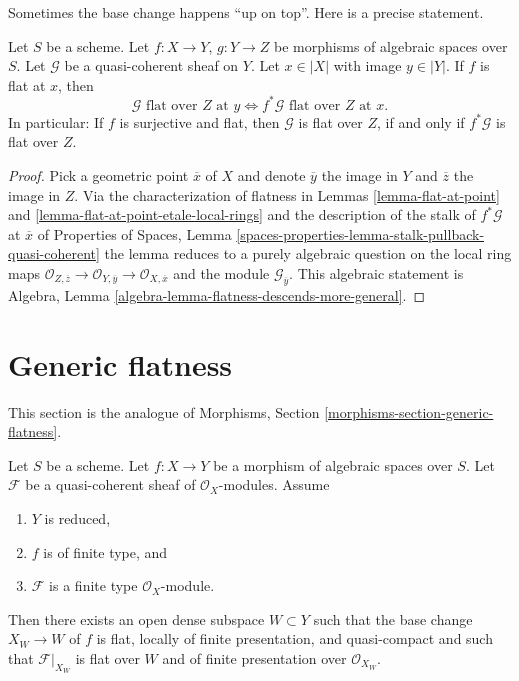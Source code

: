 \noindent
Sometimes the base change happens ``up on top''. Here is a precise statement.

\begin{lemma}
\label{lemma-flat-permanence}
Let $S$ be a scheme. Let $f : X \to Y$, $g : Y \to Z$ be morphisms of
algebraic spaces over $S$. Let $\mathcal{G}$ be a quasi-coherent sheaf on $Y$.
Let $x \in |X|$ with image $y \in |Y|$.
If $f$ is flat at $x$, then
$$
\mathcal{G}\text{ flat over }Z\text{ at }y
\Leftrightarrow
f^*\mathcal{G}\text{ flat over }Z\text{ at }x.
$$
In particular: If $f$ is surjective and flat, then
$\mathcal{G}$ is flat over $Z$, if and only if
$f^*\mathcal{G}$ is flat over $Z$.
\end{lemma}

\begin{proof}
Pick a geometric point $\overline{x}$ of $X$ and denote
$\overline{y}$ the image in $Y$ and $\overline{z}$ the image in $Z$.
Via the characterization of flatness in
Lemmas \ref{lemma-flat-at-point} and
\ref{lemma-flat-at-point-etale-local-rings}
and the description of the stalk of $f^*\mathcal{G}$ at $\overline{x}$ of
Properties of Spaces,
Lemma \ref{spaces-properties-lemma-stalk-pullback-quasi-coherent}
the lemma reduces to a purely algebraic question on the local
ring maps
$\mathcal{O}_{Z, \overline{z}} \to \mathcal{O}_{Y, \overline{y}}
\to \mathcal{O}_{X, \overline{x}}$
and the module $\mathcal{G}_{\overline{y}}$.
This algebraic statement is
Algebra, Lemma \ref{algebra-lemma-flatness-descends-more-general}.
\end{proof}






\section{Generic flatness}
\label{section-generic-flatness}

\noindent
This section is the analogue of
Morphisms, Section \ref{morphisms-section-generic-flatness}.

\begin{proposition}
\label{proposition-generic-flatness-reduced}
Let $S$ be a scheme.
Let $f : X \to Y$ be a morphism of algebraic spaces over $S$.
Let $\mathcal{F}$ be a quasi-coherent sheaf of $\mathcal{O}_X$-modules.
Assume
\begin{enumerate}
\item $Y$ is reduced,
\item $f$ is of finite type, and
\item $\mathcal{F}$ is a finite type $\mathcal{O}_X$-module.
\end{enumerate}
Then there exists an open dense subspace $W \subset Y$ such that
the base change $X_W \to W$ of $f$ is flat, locally of finite presentation, and
quasi-compact and such that $\mathcal{F}|_{X_W}$ is flat over $W$ and of
finite presentation over $\mathcal{O}_{X_W}$.
\end{proposition}

